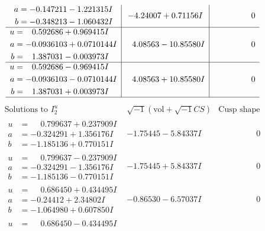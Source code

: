\documentclass[1p]{elsarticle_modified}
\theoremstyle{definition}
\newcommand{\I}{\sqrt{-1}}
\begin{document}
$$\begin{array}{c|c|c}
\begin{aligned}
a &= -0.147211 - 1.221315 I \\
b &= -0.348213 - 1.060432 I\end{aligned}
 & -4.24007 + 0.71156 I & \phantom{-0.000000 } 0 \\ \hline\begin{aligned}
u &= \phantom{-}0.592686 + 0.969415 I \\
a &= -0.0936103 + 0.0710144 I \\
b &= \phantom{-}1.387031 - 0.003973 I\end{aligned}
 & \phantom{-}4.08563 - 10.85580 I & \phantom{-0.000000 } 0 \\ \hline\begin{aligned}
u &= \phantom{-}0.592686 - 0.969415 I \\
a &= -0.0936103 - 0.0710144 I \\
b &= \phantom{-}1.387031 + 0.003973 I\end{aligned}
 & \phantom{-}4.08563 + 10.85580 I & \phantom{-0.000000 } 0\\
 \hline 
 \end{array}$$\newpage$$\begin{array}{c|c|c}  
\text{Solutions to }I^u_{2}& \I (\text{vol} + \sqrt{-1}CS) & \text{Cusp shape}\\
 \hline 
\begin{aligned}
u &= \phantom{-}0.799637 + 0.237909 I \\
a &= -0.324291 + 1.356176 I \\
b &= -1.185136 + 0.770151 I\end{aligned}
 & -1.75445 - 5.84337 I & \phantom{-0.000000 } 0 \\ \hline\begin{aligned}
u &= \phantom{-}0.799637 - 0.237909 I \\
a &= -0.324291 - 1.356176 I \\
b &= -1.185136 - 0.770151 I\end{aligned}
 & -1.75445 + 5.84337 I & \phantom{-0.000000 } 0 \\ \hline\begin{aligned}
u &= \phantom{-}0.686450 + 0.434495 I \\
a &= -0.24412 + 2.34802 I \\
b &= -1.064980 + 0.607850 I\end{aligned}
 & -0.86530 - 6.57037 I & \phantom{-0.000000 } 0 \\ \hline\begin{aligned}
u &= \phantom{-}0.686450 - 0.434495 I \\

\end{aligned}
\end{array}$$
\end{document}
